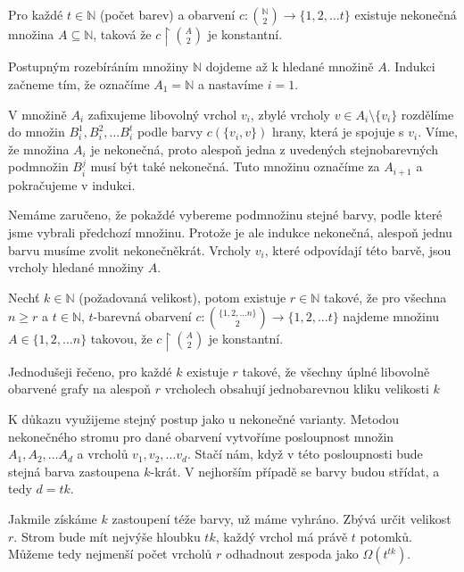 \begin{t_theorem}
  Pro každé $t\in\mathbb{N}$ (počet barev) a obarvení $c:\binom{\mathbb{N}}{2}\rightarrow\{1,2,\dots t\}$ existuje nekonečná množina $A\subseteq\mathbb{N}$, taková že $c\restriction\binom{A}{2}$ je konstantní.
\end{t_theorem}

\begin{t_proof}
  Postupným rozebíráním množiny $\mathbb{N}$ dojdeme až k hledané množině $A$. Indukci začneme tím, že označíme $A_1=\mathbb{N}$ a nastavíme $i=1$.

  V množině $A_i$ zafixujeme libovolný vrchol $v_i$, zbylé vrcholy $v\in A_i\setminus\{v_i\}$ rozdělíme do množin $B_i^1, B_i^2,\dots B_i^t$ podle barvy $c(\{v_i, v\})$ hrany, která je spojuje s $v_i$. Víme, že množina $A_i$ je nekonečná, proto alespoň jedna z uvedených stejnobarevných podmnožin $B_i^j$ musí být také nekonečná. Tuto množinu označíme za $A_{i+1}$ a pokračujeme v indukci.

  Nemáme zaručeno, že pokaždé vybereme podmnožinu stejné barvy, podle které jsme vybrali předchozí množinu. Protože je ale indukce nekonečná, alespoň jednu barvu musíme zvolit nekonečněkrát. Vrcholy $v_i$, které odpovídají této barvě, jsou vrcholy hledané množiny $A$.
\end{t_proof}

\begin{t_theorem}
  Nechť $k\in\mathbb{N}$ (požadovaná velikost), potom existuje $r\in\mathbb{N}$ takové, že pro všechna $n\geq r$ a $t\in\mathbb{N}$, $t$-barevná obarvení $c:\binom{\{1,2,\dots n\}}{2}\rightarrow\{1,2,\dots t\}$ najdeme množinu $A\in\{1,2,\dots n\}$ takovou, že $c\restriction \binom{A}{2}$ je konstantní.
\end{t_theorem}
\begin{t_remark}
  Jednodušeji řečeno, pro každé $k$ existuje $r$ takové, že všechny úplné libovolně obarvené grafy na alespoň $r$ vrcholech obsahují jednobarevnou kliku velikosti $k$
\end{t_remark}

\begin{t_proof}
  K důkazu využijeme stejný postup jako u nekonečné varianty. Metodou nekonečného stromu pro dané obarvení vytvoříme posloupnost množin $A_1, A_2,\dots A_d$ a vrcholů $v_1, v_2,\dots v_d$. Stačí nám, když v této posloupnosti bude stejná barva zastoupena $k$-krát. V nejhorším případě se barvy budou střídat, a tedy $d=tk$.

  Jakmile získáme $k$ zastoupení téže barvy, už máme vyhráno. Zbývá určit velikost $r$. Strom bude mít nejvýše hloubku $tk$, každý vrchol má právě $t$ potomků. Můžeme tedy nejmenší počet vrcholů $r$ odhadnout zespoda jako $\Omega(t^{tk})$. 
\end{t_proof}

